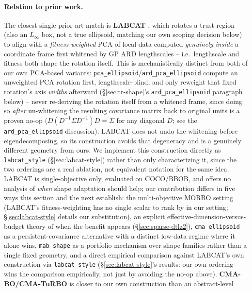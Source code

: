 \documentclass[11pt]{article}
\begin{document}
\paragraph{Relation to prior work.} The closest single prior-art match is
\textbf{LABCAT} \citep{visser2023labcat}, which rotates a trust region (also
an $L_\infty$ box, not a true ellipsoid, matching our own scoping decision
below) to align with a \emph{fitness-weighted} PCA of local data computed
\emph{genuinely inside} a coordinate frame first whitened by GP ARD
lengthscales -- i.e.\ lengthscale and fitness both shape the rotation
itself. This is mechanistically distinct from both of our own PCA-based
variants: \texttt{pca\_ellipsoid}/\texttt{ard\_pca\_ellipsoid} compute an
unweighted PCA rotation first, lengthscale-blind, and only reweight that
fixed rotation's axis \emph{widths} afterward (\S\ref{sec:tr-shape}'s
\texttt{ard\_pca\_ellipsoid} paragraph below) -- never re-deriving the
rotation itself from a
whitened frame, since doing so \emph{after} un-whitening the resulting
covariance matrix back to original units is a proven no-op
($D(D^{-1}\Sigma D^{-1})D = \Sigma$ for any diagonal $D$; see the
\texttt{ard\_pca\_ellipsoid} discussion). LABCAT does not undo the
whitening before eigendecomposing, so its construction avoids that
degeneracy and is a genuinely different geometry from ours. We implement
this construction directly as \texttt{labcat\_style}
(\S\ref{sec:labcat-style}) rather than only characterizing it, since the
two orderings are a real ablation, not equivalent notation for the same
idea. LABCAT is single-objective only, evaluated on COCO/BBOB, and offers
no analysis of \emph{when} shape adaptation should help; our contribution
differs in five ways this section and the next establish: the
multi-objective MORBO setting (LABCAT's fitness-weighting has no single
scalar to rank by in our setting; \S\ref{sec:labcat-style} details our
substitution), an explicit effective-dimension-versus-budget theory of when
the benefit appears (\S\ref{sec:sparse-dtlz2}), \texttt{cma\_ellipsoid} as a
persistent-covariance alternative with a distinct low-data regime where it
alone wins, \texttt{mab\_shape} as a portfolio mechanism over shape
families rather than a single fixed geometry, and a direct empirical
comparison against LABCAT's own construction via \texttt{labcat\_style}
(\S\ref{sec:labcat-style}'s results: our own ordering wins the comparison
empirically, not just by avoiding the no-op above). \textbf{CMA-BO/CMA-TuRBO}
\citep{ngo2024cmabo} is closer to our own construction than an abstract-level
\end{document}
